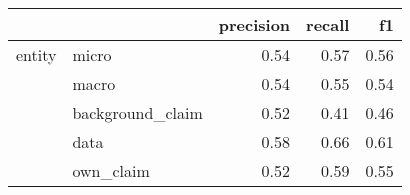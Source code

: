 \begin{tabular}{llrrr}
\toprule
       &           &  precision &  recall &   f1 \\
\midrule
entity & micro &       0.54 &    0.57 & 0.56 \\
       & macro &       0.54 &    0.55 & 0.54 \\
       & background\_claim &       0.52 &    0.41 & 0.46 \\
       & data &       0.58 &    0.66 & 0.61 \\
       & own\_claim &       0.52 &    0.59 & 0.55 \\
\bottomrule
\end{tabular}
